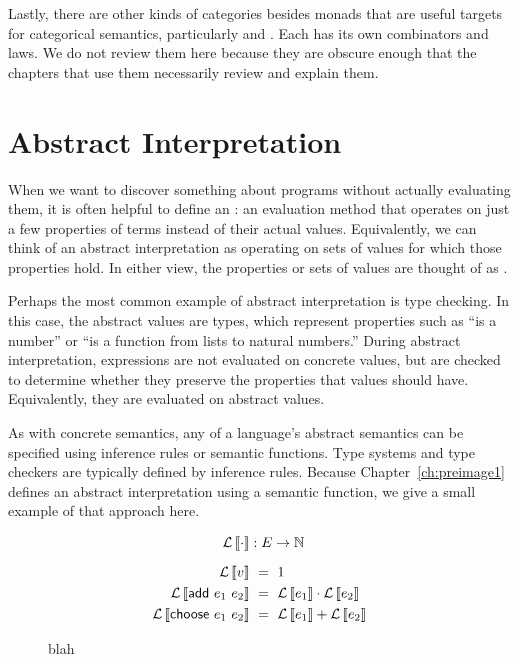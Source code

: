 {Lastly, there are other kinds of categories besides monads that are useful targets for categorical semantics, particularly  and .
Each has its own combinators and laws.
We do not review them here because they are obscure enough that the chapters that use them necessarily review and explain them.


\section{Abstract Interpretation}

When we want to discover something about programs without actually evaluating them, it is often helpful to define an : an evaluation method that operates on just a few properties of terms instead of their actual values.
Equivalently, we can think of an abstract interpretation as operating on sets of values for which those properties hold.
In either view, the properties or sets of values are thought of as .

Perhaps the most common example of abstract interpretation is type checking.
In this case, the abstract values are types, which represent properties such as ``is a number'' or ``is a function from lists to natural numbers.''
During abstract interpretation, expressions are not evaluated on concrete values, but are checked to determine whether they preserve the properties that values should have.
Equivalently, they are evaluated on abstract values.

As with concrete semantics, any of a language's abstract semantics can be specified using inference rules or semantic functions.
Type systems and type checkers are typically defined by inference rules.
Because Chapter~\ref{ch:preimage1} defines an abstract interpretation using a semantic function, we give a small example of that approach here.

\begin{figure*}[tb]\centering
\begin{varwidth}[b]{\textwidth}
\begin{equation*}
\begin{aligned}
	\mathcal{L}\meaningof{\cdot} &: E \to \Nat
	\\[6pt]
	\mathcal{L}\meaningof{v} &\ =\ 1 \\
	\mathcal{L}\meaningof{\mathsf{add}~e_1~e_2} &\ =\ \mathcal{L}\meaningof{e_1} \cdot \mathcal{L}\meaningof{e_2} \\
	\mathcal{L}\meaningof{\mathsf{choose}~e_1~e_2} &\ =\ \mathcal{L}\meaningof{e_1} + \mathcal{L}\meaningof{e_2}  \\
\end{aligned}
\end{equation*}
\end{varwidth}
\bottomhrule
\caption[ ]{blah}
\label{fig:add-choose-abstract}
\end{figure*}

}
